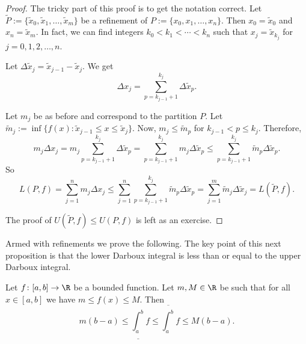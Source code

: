 \documentclass[12pt]{book}
\begin{document}
\begin{proof}
The tricky part of this proof is to get the notation correct.
Let $\widetilde{P} := \{ \widetilde{x}_0, \widetilde{x}_1, \ldots,
\widetilde{x}_m \}$ be
a refinement of 
$P := \{ x_0, x_1, \ldots, x_n \}$.
Then
$x_0 = \widetilde{x}_0$ and 
$x_n = \widetilde{x}_m$.
In fact, we can find integers
$k_0 < k_1 < \cdots < k_n$ such that $x_j = \widetilde{x}_{k_j}$ for
$j=0,1,2,\ldots,n$.

Let $\Delta \widetilde{x}_j = \widetilde{x}_{j-1} - \widetilde{x}_j$.
We get 
\begin{equation*}
\Delta x_j
=
\sum_{p=k_{j-1}+1}^{k_j} \Delta \widetilde{x}_p .
\end{equation*}

Let $m_j$ be as before and correspond to the partition $P$.
Let $\widetilde{m}_j := \inf \{ f(x) : \widetilde{x}_{j-1} \leq x \leq
\widetilde{x}_j \}$.
Now, $m_j \leq \widetilde{m}_p$ for $k_{j-1} < p \leq k_j$.
Therefore,
\begin{equation*}
m_j \Delta x_j
=
m_j \sum_{p=k_{j-1}+1}^{k_j} \Delta \widetilde{x}_p
=
\sum_{p=k_{j-1}+1}^{k_j} m_j \Delta \widetilde{x}_p
\leq
\sum_{p=k_{j-1}+1}^{k_j} \widetilde{m}_p \Delta \widetilde{x}_p .
\end{equation*}
So
\begin{equation*}
L(P,f) =
\sum_{j=1}^n m_j \Delta x_j
\leq
\sum_{j=1}^n
\sum_{p=k_{j-1}+1}^{k_j} \widetilde{m}_p \Delta \widetilde{x}_p
=
\sum_{j=1}^m
\widetilde{m}_j \Delta \widetilde{x}_j = L(\widetilde{P},f).
\end{equation*}

The proof of $U(\widetilde{P},f) \leq U(P,f)$ is left as an exercise.
\end{proof}

Armed with refinements we prove the following.
The key point of this next proposition is that
the lower Darboux integral is less than or equal to the upper Darboux
integral.

\begin{prop} \label{intulbound:prop}
Let $f \colon [a,b] \to \R$ be a bounded function.
Let $m, M \in \R$ be 
such that for all $x \in [a,b]$ we have $m \leq f(x) \leq M$.
Then
\begin{equation}
\label{intulbound:eq}
m(b-a) \leq
\underline{\int_a^b} f \leq \overline{\int_a^b} f
\leq M(b-a) .
\end{equation}
\end{prop}
\end{document}

